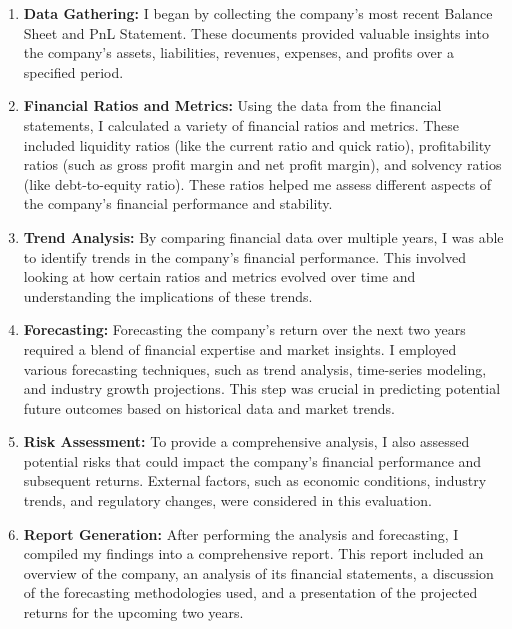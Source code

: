 \begin{enumerate}
    \item \textbf{Data Gathering:} I began by collecting the company's most recent Balance Sheet and PnL Statement. These documents provided valuable insights into the company's assets, liabilities, revenues, expenses, and profits over a specified period.
    
    \item \textbf{Financial Ratios and Metrics:} Using the data from the financial statements, I calculated a variety of financial ratios and metrics. These included liquidity ratios (like the current ratio and quick ratio), profitability ratios (such as gross profit margin and net profit margin), and solvency ratios (like debt-to-equity ratio). These ratios helped me assess different aspects of the company's financial performance and stability.
    
    \item \textbf{Trend Analysis:} By comparing financial data over multiple years, I was able to identify trends in the company's financial performance. This involved looking at how certain ratios and metrics evolved over time and understanding the implications of these trends.
    
    \item \textbf{Forecasting:} Forecasting the company's return over the next two years required a blend of financial expertise and market insights. I employed various forecasting techniques, such as trend analysis, time-series modeling, and industry growth projections. This step was crucial in predicting potential future outcomes based on historical data and market trends.
    
    \item \textbf{Risk Assessment:} To provide a comprehensive analysis, I also assessed potential risks that could impact the company's financial performance and subsequent returns. External factors, such as economic conditions, industry trends, and regulatory changes, were considered in this evaluation.
    
    \item \textbf{Report Generation:} After performing the analysis and forecasting, I compiled my findings into a comprehensive report. This report included an overview of the company, an analysis of its financial statements, a discussion of the forecasting methodologies used, and a presentation of the projected returns for the upcoming two years.
\end{enumerate}

